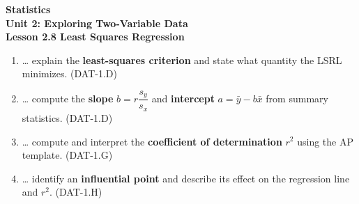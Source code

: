 \documentclass[10pt]{article}
\begin{document}
\vspace{-0.8in}

\begin{center}
  {\color{white}\textbf{\LARGE Statistics}}\\[4pt]
  {\color{skymid}\large\textbf{Unit 2: Exploring Two-Variable Data}}\\[6pt]
  {\color{white}\textbf{\large Lesson 2.8 \quad Least Squares Regression}}
\end{center}

\vspace{0.22in}
\namedateperiod
\vspace{0.18in}

\begin{learningtargetbox}
\small
\begin{enumerate}[leftmargin=1.5em, itemsep=5pt]
  \item \ldots{} explain the \textbf{least-squares criterion} and state what quantity the LSRL
        minimizes. \hfill\textcolor{slate}{\small(DAT-1.D)}
  \item \ldots{} compute the \textbf{slope} $b = r\dfrac{s_y}{s_x}$ and
        \textbf{intercept} $a = \bar{y} - b\bar{x}$ from summary statistics.
        \hfill\textcolor{slate}{\small(DAT-1.D)}
  \item \ldots{} compute and interpret the \textbf{coefficient of determination} $r^2$
        using the AP template. \hfill\textcolor{slate}{\small(DAT-1.G)}
  \item \ldots{} identify an \textbf{influential point} and describe its effect on the
        regression line and $r^2$. \hfill\textcolor{slate}{\small(DAT-1.H)}
\end{enumerate}
\end{learningtargetbox}

\vspace{0.14in}
\end{document}
